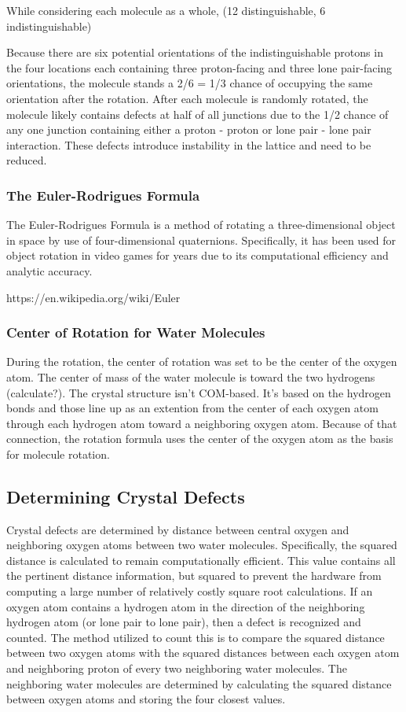 While considering each molecule as a whole, (12 distinguishable, 6 indistinguishable)

Because there are six potential orientations of the indistinguishable protons in the four locations each containing three proton-facing and three lone pair-facing orientations, the molecule stands a 2/6 = 1/3 chance of occupying the same orientation after the rotation.
After each molecule is randomly rotated, the molecule likely contains defects at half of all junctions due to the 1/2 chance of any one junction containing either a proton - proton or lone pair - lone pair interaction. 
These defects introduce instability in the lattice and need to be reduced.

\subsubsection{The Euler-Rodrigues Formula}
The Euler-Rodrigues Formula is a method of rotating a three-dimensional object in space by use of four-dimensional quaternions. 
Specifically, it has been used for object rotation in video games for years due to its computational efficiency and analytic accuracy.

https://en.wikipedia.org/wiki/Euler%

\subsubsection{Center of Rotation for Water Molecules}
During the rotation, the center of rotation was set to be the center of the oxygen atom. 
The center of mass of the water molecule is toward the two hydrogens (calculate?). 
The crystal structure isn’t COM-based. 
It’s based on the hydrogen bonds and those line up as an extention from the center of each oxygen atom through each hydrogen atom toward a neighboring oxygen atom. 
Because of that connection, the rotation formula uses the center of the oxygen atom as the basis for molecule rotation.

\subsection{Determining Crystal Defects}
Crystal defects are determined by distance between central oxygen and neighboring oxygen atoms between two water molecules. 
Specifically, the squared distance is calculated to remain computationally efficient. 
This value contains all the pertinent distance information, but squared to prevent the hardware from computing a large number of relatively costly square root calculations. 
If an oxygen atom contains a hydrogen atom in the direction of the neighboring hydrogen atom (or lone pair to lone pair), then a defect is recognized and counted. 
The method utilized to count this is to compare the squared distance between two oxygen atoms with the squared distances between each oxygen atom and neighboring proton of every two neighboring water molecules. 
The neighboring water molecules are determined by calculating the squared distance between oxygen atoms and storing the four closest values.

